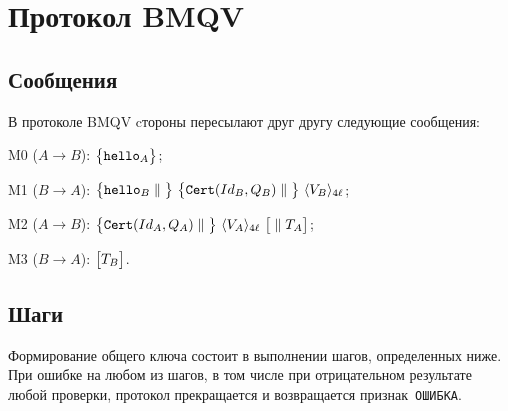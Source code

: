 \section{Протокол BMQV}\label{MQV}

\subsection{Сообщения}\label{MQV.Messages}

В протоколе BMQV
cтороны пересылают друг другу следующие сообщения:

M0 ($A\to B$): 
$\mathbf{\bigl\{}\texttt{hello}_A\mathbf{\bigr\}}$;

M1 ($B\to A$): 
$\mathimplicit{\hello_B\parallel}\ 
\mathimplicit{\Cert(Id_B, Q_B)\parallel}\ 
\langle V_B\rangle_{4\ell}$;

M2 ($A\to B$): 
$\mathimplicit{\Cert(Id_A,Q_A)\parallel}\ 
\langle V_A\rangle_{4\ell}\ \mathoptional{\parallel T_A}$;

M3 ($B\to A$): 
$\mathbf{\bigl[}T_B\mathbf{\bigr]}$.

\subsection{Шаги}\label{MQV.Steps}

Формирование общего ключа состоит в выполнении шагов, определенных ниже. При
ошибке на любом из шагов, в том числе при отрицательном результате любой
проверки, протокол прекращается и возвращается признак~\texttt{ОШИБКА}.

